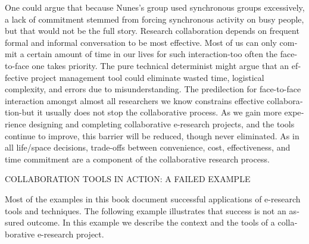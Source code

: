 \documentclass[a4paper,12pt]{article}
\begin{document}
\begin{latin}
\noindent
One could argue that because Nunes's  group used synchronous  groups  excessively,  a lack of commitment stemmed  from forcing synchronous  activity on busy people,  but that would not be the full story. Research collaboration  depends on frequent formal and informal conversation to be most effective. Most of us can only commit a certain amount of time in our lives for such interaction-too often the face-to-face one takes priority. The pure technical determinist might argue that an effective project management tool could eliminate wasted time, logistical complexity, and errors due to misunderstanding. The predilection for face-to-face  interaction amongst  almost all researchers  we know constrains effective collaboration-but it usually does not stop the collaborative process. As we gain more experience designing and completing collaborative e-research projects, and the tools continue to improve, this barrier will be reduced, though never eliminated. As in all life/space decisions, trade-offs between  convenience, cost, effectiveness, and time commitment are a component of the collaborative research process.
\begin{center}
COLLABORATION TOOLS  IN ACTION: A FAILED  EXAMPLE
\end{center}

\noindent
Most  of the examples in this book document  successful  applications  of e-research  tools and techniques. The following example illustrates that success is not an assured outcome. In this example we describe the context and the tools of a collaborative e-research project. 



\end{latin}
\end{document}
